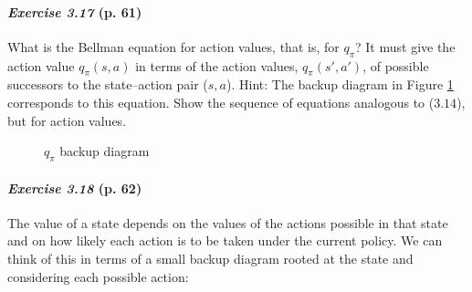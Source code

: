 \documentclass[10pt,a4paper]{article}
\begin{document}
\paragraph{\textit{Exercise 3.17} (p. 61)} What is the Bellman equation for action values, that is, for $q_\pi$? It must give the action value $q_\pi(s, a)$ in terms of the action values, $q_\pi(s', a')$, of possible successors to the state–action pair ($s, a$).
Hint: The backup diagram in Figure  \ref{bellman_eq_action_val} corresponds to this equation.
Show the sequence of equations analogous to ($3.14$), but for action
values.


\begin{figure}[h]
\centering
{}
\caption{$q_\pi$ backup diagram}
\label{bellman_eq_action_val}
\end{figure}

\paragraph{\textit{Exercise 3.18} (p. 62)} The value of a state depends on the values of the actions possible in that state and on how likely each action is to be taken under the current policy. We can
think of this in terms of a small backup diagram rooted at the state and considering each
possible action:
\end{document}
